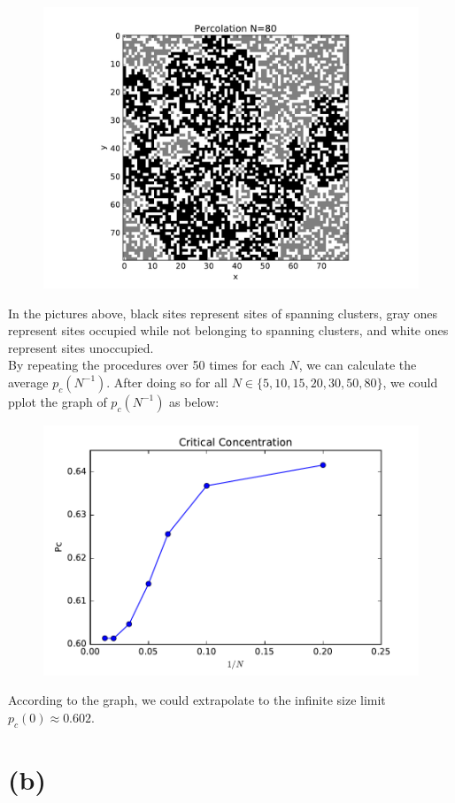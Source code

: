 \documentclass{article}
\begin{document}
\begin{figure}[H]
  \includegraphics[width=\linewidth]{percolation_80.pdf}
  \label{delta02}
\endminipage\hfill
\end{figure}
In the pictures above, black sites represent sites of spanning clusters, gray ones represent sites occupied while not belonging to spanning clusters, and white ones represent sites unoccupied.\\
\indent By repeating the procedures over 50 times for each $N$, we can calculate the average $p_c(N^{-1})$. After doing so for all $N\in\{5, 10, 15, 20, 30, 50, 80\}$, we could pplot the graph of $p_c(N^{-1})$ as below:
\begin{figure}[H]
\includegraphics{Critical.pdf}
\end{figure}
According to the graph, we could extrapolate to the infinite size limit $p_c(0)\approx0.602$.
\section{(b)}
\end{document}
